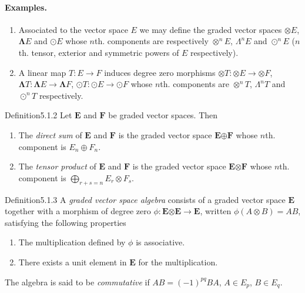 \paragraph{Examples.}
\begin{enumerate}
\item Associated to the vector space $E$ we may define the graded vector spaces $\boldsymbol\otimes E$, $\boldsymbol\Lambda E$ and $\boldsymbol\odot E$ whose $n$th. components are respectively $\otimes^n E$, $\Lambda^n E$ and $\odot^n E$ ($n$th. tensor, exterior and symmetric powers of $E$ respectively).
\item A linear map $T:E\to F$ induces degree zero morphisms $\boldsymbol\otimes T:\boldsymbol\otimes E\longrightarrow\boldsymbol\otimes F$, $\boldsymbol\Lambda T:\boldsymbol\Lambda E\longrightarrow\boldsymbol\Lambda F$, $\boldsymbol\odot T:\boldsymbol\odot E\longrightarrow\boldsymbol\odot F$ whose $n$th. components are $\otimes^n T$, $\Lambda^n T$ and $\odot^n T$ respectively.
\end{enumerate}
\begin{originaltheorem}{Definition}{5.1.2}
Let $\mathbf E$ and $\mathbf F$ be graded vector spaces. Then
\begin{enumerate}
\item The \emph{direct sum} of $\mathbf E$ and $\mathbf F$ is the graded vector space $\mathbf E\boldsymbol\oplus\mathbf F$ whose $n$th. component is $E_n\oplus F_n$.
\item The \emph{tensor product} of $\mathbf E$ and $\mathbf F$ is the graded vector space $\mathbf E\boldsymbol\otimes\mathbf F$ whose $n$th. component is $\displaystyle\bigoplus_{r+s=n}E_r\otimes F_s$.
\end{enumerate}
\end{originaltheorem}
\begin{originaltheorem}{Definition}{5.1.3}
A \emph{graded vector space algebra} consists of a graded vector space $\mathbf E$ together with a morphism of degree zero $\phi:\mathbf E\boldsymbol\otimes\mathbf E\longrightarrow\mathbf E$, written $\phi(A\otimes B)=AB$, satisfying the following properties
\begin{enumerate}
\item The multiplication defined by $\phi$ is associative.
\item There exists a unit element in $\mathbf E$ for the multiplication.
\end{enumerate}
The algebra is said to be \emph{commutative} if $AB=(-1)^{pq}BA$, $A\in E_p$, $B\in E_q$.
\end{originaltheorem}
